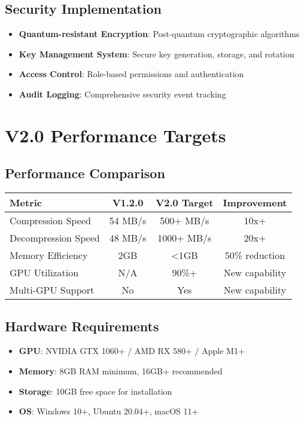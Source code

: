 \documentclass[12pt,a4paper]{article}
\begin{document}
\subsection{Security Implementation}
\begin{itemize}
    \item \textbf{Quantum-resistant Encryption}: Post-quantum cryptographic algorithms
    \item \textbf{Key Management System}: Secure key generation, storage, and rotation
    \item \textbf{Access Control}: Role-based permissions and authentication
    \item \textbf{Audit Logging}: Comprehensive security event tracking
\end{itemize}

\section{V2.0 Performance Targets}

\subsection{Performance Comparison}
\begin{center}
\begin{tabular}{|l|c|c|c|}
\hline
\textbf{Metric} & \textbf{V1.2.0} & \textbf{V2.0 Target} & \textbf{Improvement} \\
\hline
Compression Speed & 54 MB/s & 500+ MB/s & 10x+ \\
Decompression Speed & 48 MB/s & 1000+ MB/s & 20x+ \\
Memory Efficiency & 2GB & <1GB & 50\% reduction \\
GPU Utilization & N/A & 90\%+ & New capability \\
Multi-GPU Support & No & Yes & New capability \\
\hline
\end{tabular}
\end{center}

\subsection{Hardware Requirements}
\begin{itemize}
    \item \textbf{GPU}: NVIDIA GTX 1060+ / AMD RX 580+ / Apple M1+
    \item \textbf{Memory}: 8GB RAM minimum, 16GB+ recommended
    \item \textbf{Storage}: 10GB free space for installation
    \item \textbf{OS}: Windows 10+, Ubuntu 20.04+, macOS 11+
\end{itemize}
\end{document}
